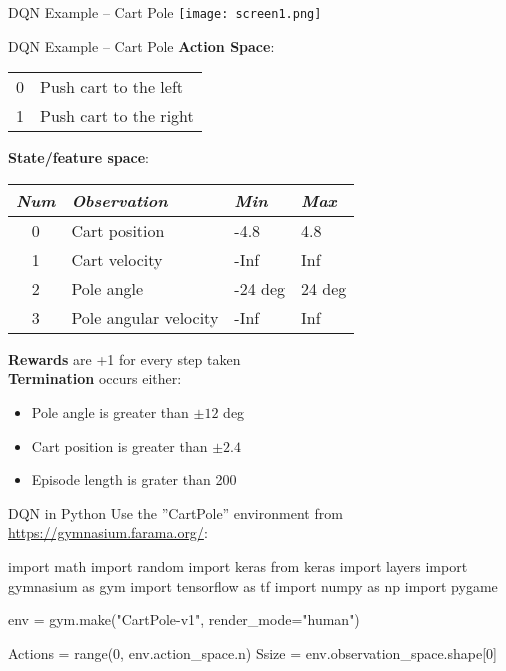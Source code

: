 \documentclass[ignorenonframetext,xcolor=x11names]{beamer}
\begin{document}
\begin{frame}{DQN Example -- Cart Pole}
\centering
\texttt{[image: screen1.png]}
\end{frame}

\begin{frame}{DQN Example -- Cart Pole}
\small
\textbf{Action Space}:
\begin{center}
\begin{tabular}{c|l} \hline
0 & Push cart to the left \\
1 & Push cart to the right \\ \hline
\end{tabular}
\end{center}


\textbf{State/feature space}:
\begin{center}
\begin{tabular}{c|l|l|l} \hline
\emph{Num} & \emph{Observation} & \emph{Min} & \emph{Max} \\ \hline
0 & Cart position & -4.8 & 4.8 \\
1 & Cart velocity & -Inf & Inf \\
2 & Pole angle & -24 deg & 24 deg \\
3 & Pole angular velocity & -Inf & Inf \\ \hline
\end{tabular}
\end{center}

\textbf{Rewards} are +1 for every step taken \\

\textbf{Termination} occurs either:
\begin{itemize}
\item Pole angle is greater than $\pm 12$ deg
\item Cart position is greater than $\pm 2.4$
\item Episode length is grater than 200
\end{itemize}
\end{frame}


\begin{frame}[fragile]{DQN in Python}
Use the ''CartPole'' environment from \url{https://gymnasium.farama.org/}:
\begin{pythoncode}
import math
import random
import keras
from keras import layers
import gymnasium as gym
import tensorflow as tf
import numpy as np
import pygame

env = gym.make("CartPole-v1", render_mode="human")

Actions = range(0, env.action_space.n)
Ssize = env.observation_space.shape[0]
\end{pythoncode}
\end{frame}
\end{document}
